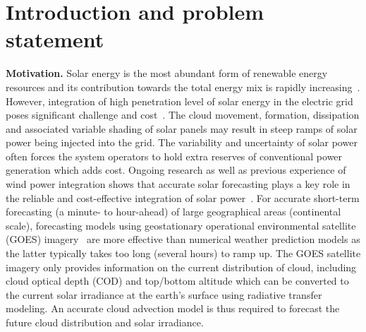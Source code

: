 \documentclass[onecolumn, 12pt, conference]{ieeeconf}
\begin{document}
\section{Introduction and problem statement}
\label{sec:intro}
\textbf{Motivation.} Solar energy is the most abundant form of renewable energy resources and its contribution towards the total energy mix is rapidly increasing~\cite{US_DoE2012}. However, integration of high penetration level of solar energy in the electric grid poses significant challenge and cost~\cite{denholm_EP_2007}. The cloud movement, formation, dissipation and associated variable shading of solar panels may result in steep ramps of solar power being injected into the grid. The variability and uncertainty of solar power often forces the system operators to hold extra reserves of conventional power generation which adds cost. Ongoing research as well as previous experience of wind power integration shows that accurate solar forecasting plays a key role in the reliable and cost-effective integration of solar power~\cite{LuHamann_IEEE_Energy_2014}. For accurate short-term forecasting (a minute- to hour-ahead) of large geographical areas (continental scale), forecasting models using geostationary operational environmental satellite (GOES) imagery~\cite{Perez_SolarEnergy_2002} are more effective than numerical weather prediction models as the latter typically takes too long (several hours) to ramp up. The GOES satellite imagery only provides information on the current distribution of cloud, including cloud optical depth (COD) and top/bottom altitude which can be converted to the current solar irradiance at the earth’s surface using radiative transfer modeling. An accurate cloud advection model is thus required to forecast the future cloud distribution and solar irradiance.
\end{document}
